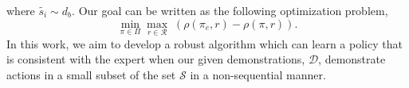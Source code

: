 \documentclass[10pt]{article}
\newcommand{\mm}[1]{\textcolor{blue}{[#1]}}
\begin{document}




where $\tilde{s_i} \sim d_b$. Our goal can be written as the following optimization problem,
\begin{equation} \label{eq:IRL_formulation}
	\min_{\pi \in \Pi} \max_{r \in \mathcal{R}} \; (\rho(\pi_e, r) - \rho(\pi, r)).
\end{equation}
In this work, we aim to develop a robust algorithm which can learn a policy that is
consistent with the expert when our given demonstrations, $\mathcal{D}$, demonstrate actions in a small subset of the set $\mathcal{S}$ in a non-sequential manner.

\end{document}

